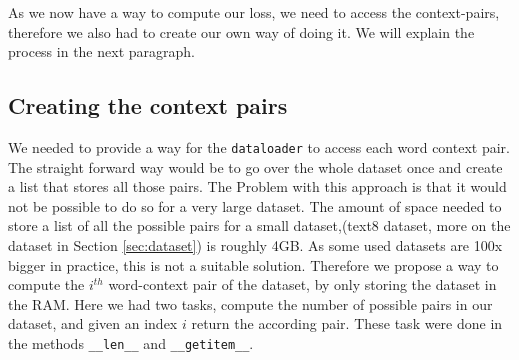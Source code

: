 
As we now have a way to compute our loss, we need to access the context-pairs, therefore we also had to create our own way of doing it. We will explain the process in the next paragraph.

\subsection{Creating the context pairs}
We needed to provide a way for the \texttt{dataloader} to access each word context pair. The straight forward way would be to go  over the whole dataset once and create a list that stores all those pairs. The Problem with this approach is that it would not be possible to do so for a very large dataset. The amount of space  needed to store a list of all the possible pairs for a small
dataset,(text8 dataset, more on the dataset in Section \ref{sec:dataset}) is roughly 4GB.  As some used datasets are 100x bigger in practice, this is not a suitable solution. Therefore we propose a way to compute the $i^{th}$ word-context pair of the dataset, by only storing the dataset in the RAM. Here we had two tasks, compute the number of possible pairs in our dataset, and given an index $i$ return the according pair. These task were done in the methods \texttt{\_\_len\_\_} and \texttt{\_\_getitem\_\_}.

